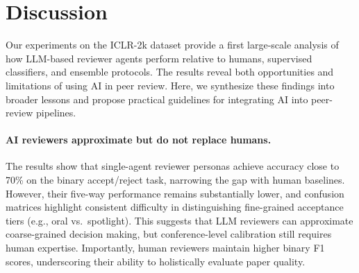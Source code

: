 \documentclass{article} %
\newcommand{\shrink}[1][0.5]{\vspace{-#1\baselineskip}}
\begin{document}



\section{Discussion}

Our experiments on the ICLR-2k dataset provide a first large-scale analysis of how LLM-based reviewer agents perform relative to humans, supervised classifiers, and ensemble protocols. The results reveal both opportunities and limitations of using AI in peer review. Here, we synthesize these findings into broader lessons and propose practical guidelines for integrating AI into peer-review pipelines.

\paragraph{AI reviewers approximate but do not replace humans.} \shrink[0.75]
The results show that single-agent reviewer personas achieve accuracy close to 70\% on the binary accept/reject task, narrowing the gap with human baselines. However, their five-way performance remains substantially lower, and confusion matrices highlight consistent difficulty in distinguishing fine-grained acceptance tiers (e.g., oral vs.\ spotlight). This suggests that LLM reviewers can approximate coarse-grained decision making, but conference-level calibration still requires human expertise. Importantly, human reviewers maintain higher binary F1 scores, underscoring their ability to holistically evaluate paper quality.
\end{document}
